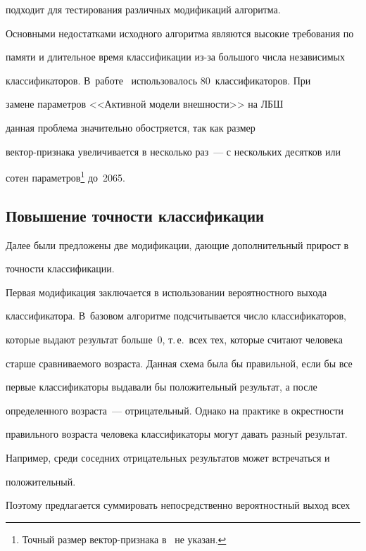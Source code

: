 подходит для тестирования различных модификаций алгоритма.



Основными недостатками исходного алгоритма являются высокие требования по

памяти и длительное время классификации из-за большого числа независимых

классификаторов. В~работе~\cite{5-r} использовалось 80~классификаторов. При

замене параметров <<Активной модели внешности>> на ЛБШ

 данная проблема значительно обостряется, так как размер

век\-тор-приз\-на\-ка увеличивается в несколько раз~--- с нескольких десятков или

сотен параметров\footnote{Точный размер вектор-признака в~\cite{5-r} не указан.} до~2065.



\subsection{Повышение точности классификации}



Далее были предложены две модификации, дающие дополнительный прирост в

точности классификации.



Первая модификация заключается в использовании вероятностного выхода

классификатора. В~базовом алгоритме подсчитывается число классификаторов,

которые выдают результат больше~0, т.\,е.\ всех тех, которые считают человека

старше сравниваемого возраста. Данная схема была бы правильной, если бы все

первые классификаторы выдавали бы положительный результат, а после

определенного возраста~--- отрицательный. Однако на практике в окрестности

правильного возраста человека классификаторы могут давать разный результат.

Например, среди соседних отрицательных результатов может встречаться и

положительный.



Поэтому предлагается суммировать непосредственно вероятностный выход всех

